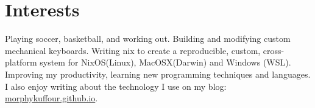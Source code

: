 \documentclass[a4paper,20pt]{article}
\begin{document}
 
\vspace{5pt}
\section{Interests}
\vspace{5pt}
Playing soccer, basketball, and working out. Building and modifying custom mechanical keyboards. Writing nix to create a reproducible, custom, cross-platform system for NixOS(Linux), MacOSX(Darwin) and Windows (WSL). Improving my productivity, learning new programming techniques and languages. I also enjoy writing about the technology I use on my blog: \href{https://morphykuffour.github.io/}{morphykuffour.github.io}. \\
\end{document}
